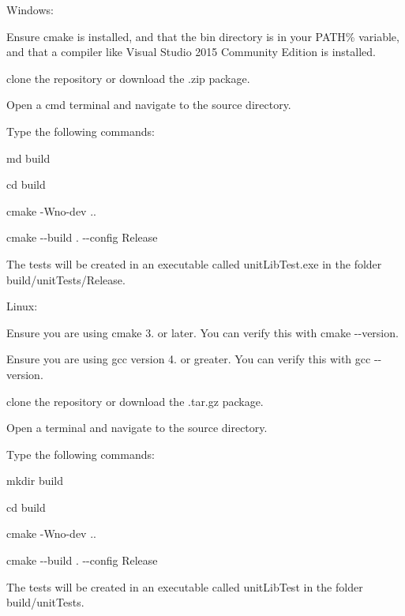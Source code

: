 Windows\+:
\begin{DoxyEnumerate}
\item Ensure cmake is installed, and that the {\ttfamily bin} directory is in your P\+A\+T\+H\% variable, and that a compiler like {\ttfamily Visual Studio 2015 Community Edition} is installed.
\item clone the repository or download the {\ttfamily .zip} package.
\item Open a {\ttfamily cmd} terminal and navigate to the source directory.
\item Type the following commands\+:
\begin{DoxyItemize}
\item {\ttfamily md build}
\item {\ttfamily cd build}
\item {\ttfamily cmake -\/\+Wno-\/dev ..}
\item {\ttfamily cmake -\/-\/build . -\/-\/config Release}
\end{DoxyItemize}
\item The tests will be created in an executable called {\ttfamily unit\+Lib\+Test.\+exe} in the folder {\ttfamily build/unit\+Tests/\+Release}.
\end{DoxyEnumerate}

Linux\+:
\begin{DoxyEnumerate}
\item Ensure you are using cmake 3. or later. You can verify this with {\ttfamily cmake -\/-\/version}.
\item Ensure you are using gcc version 4. or greater. You can verify this with {\ttfamily gcc -\/-\/version}.
\item clone the repository or download the {\ttfamily .tar.\+gz} package.
\item Open a terminal and navigate to the source directory.
\item Type the following commands\+:
\begin{DoxyItemize}
\item {\ttfamily mkdir build}
\item {\ttfamily cd build}
\item {\ttfamily cmake -\/\+Wno-\/dev ..}
\item {\ttfamily cmake -\/-\/build . -\/-\/config Release}
\end{DoxyItemize}
\item The tests will be created in an executable called {\ttfamily unit\+Lib\+Test} in the folder {\ttfamily build/unit\+Tests}.
\end{DoxyEnumerate}

